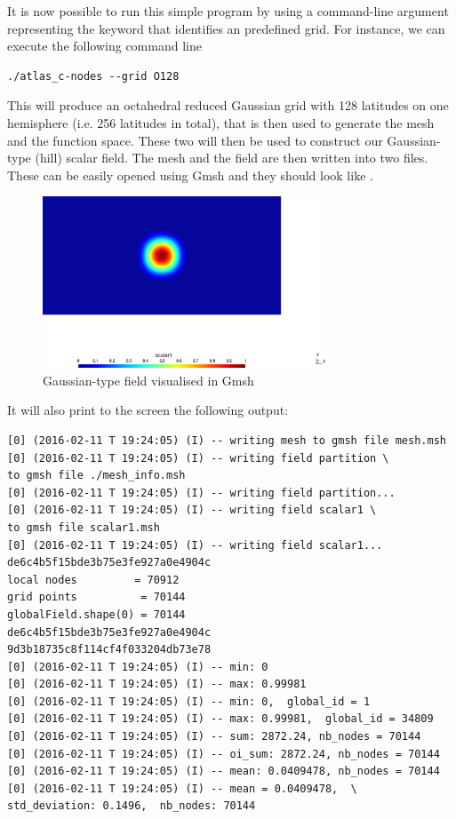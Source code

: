 %
It is now possible to run this simple program by using 
a command-line argument representing the keyword that 
identifies an \Atlas predefined grid.  For instance, 
we can execute the following command line
%
\begin{lstlisting}[style=BashStyle]
./atlas_c-nodes --grid O128
\end{lstlisting}
% 
This will produce an octahedral reduced Gaussian grid 
with 128 latitudes on one hemisphere (i.e. 256 latitudes 
in total), that is then used to generate the mesh and the 
 function space. These two will then be used 
to construct our Gaussian-type (hill) scalar field.
The mesh and the field are then written into two 
files. These can be easily opened using Gmsh and they should 
look like .
%
\begin{figure}%
\centering
\includegraphics[width=0.75\textwidth]{imgs/O128-field.png}
\caption{Gaussian-type field visualised in Gmsh}%
\label{fig:fs_nodes-C}%
\end{figure}
%
It will also print to the screen the following output:
%
\begin{lstlisting}[style=BashStyle]
[0] (2016-02-11 T 19:24:05) (I) -- writing mesh to gmsh file mesh.msh
[0] (2016-02-11 T 19:24:05) (I) -- writing field partition \
to gmsh file ./mesh_info.msh
[0] (2016-02-11 T 19:24:05) (I) -- writing field partition...
[0] (2016-02-11 T 19:24:05) (I) -- writing field scalar1 \
to gmsh file scalar1.msh
[0] (2016-02-11 T 19:24:05) (I) -- writing field scalar1...
de6c4b5f15bde3b75e3fe927a0e4904c
local nodes         = 70912
grid points          = 70144
globalField.shape(0) = 70144
de6c4b5f15bde3b75e3fe927a0e4904c
9d3b18735c8f114cf4f033204db73e78
[0] (2016-02-11 T 19:24:05) (I) -- min: 0
[0] (2016-02-11 T 19:24:05) (I) -- max: 0.99981
[0] (2016-02-11 T 19:24:05) (I) -- min: 0,  global_id = 1
[0] (2016-02-11 T 19:24:05) (I) -- max: 0.99981,  global_id = 34809
[0] (2016-02-11 T 19:24:05) (I) -- sum: 2872.24, nb_nodes = 70144
[0] (2016-02-11 T 19:24:05) (I) -- oi_sum: 2872.24, nb_nodes = 70144
[0] (2016-02-11 T 19:24:05) (I) -- mean: 0.0409478, nb_nodes = 70144
[0] (2016-02-11 T 19:24:05) (I) -- mean = 0.0409478,  \
std_deviation: 0.1496,  nb_nodes: 70144
\end{lstlisting}
